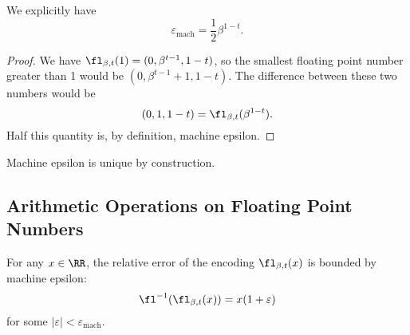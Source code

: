 \begin{thm}
  We explicitly have
  \begin{equation}
    \varepsilon_{\text{mach}} = \frac{1}{2}\beta^{1-t}.
  \end{equation}
\end{thm}
\begin{proof}
  We have $\fl_{\beta,t}(1) = (0,\beta^{t-1},1-t)$, so the smallest
  floating point number greater than 1 would be $(0,\beta^{t-1}+1,1-t)$.
  The difference between these two numbers would be
  \begin{equation}
  (0,1,1-t)=\fl_{\beta,t}(\beta^{1-t}).
  \end{equation}
  Half this quantity is, by definition, machine epsilon.
\end{proof}

\begin{rmk}
Machine epsilon is unique by construction.
\end{rmk}

\subsection{Arithmetic Operations on Floating Point Numbers}

\begin{prop}
For any $x\in\RR$, the relative error of the encoding $\fl_{\beta,t}(x)$
is bounded by machine epsilon:
\begin{equation}
  \fl^{-1}(\fl_{\beta,t}(x)) = x(1 + \varepsilon)
\end{equation}
for some $|\varepsilon|<\varepsilon_{\text{mach}}$.
\end{prop}

